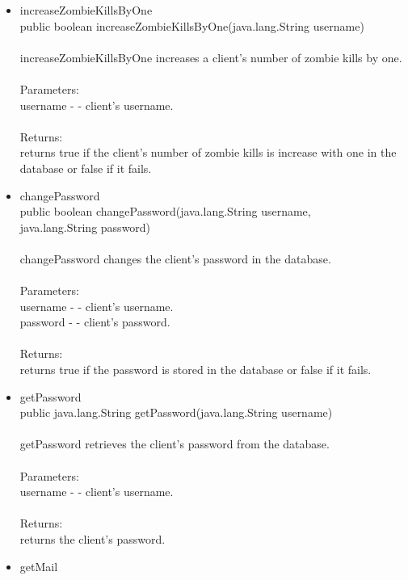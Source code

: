\documentclass[letterpaper]{article}
\begin{document}
\begin{itemize}
\begin{itemize}
											\item	increaseZombieKillsByOne \\
													public boolean increaseZombieKillsByOne(java.lang.String username) \\ \\
													increaseZombieKillsByOne increases a client's number of zombie kills by one. \\ \\
													Parameters: \\
													username - - client's username. \\ \\
													Returns: \\
													returns true if the client's number of zombie kills is increase with one in the database or false if it fails.
											\item	changePassword \\
													public boolean changePassword(java.lang.String username, \\
				                     java.lang.String password) \\ \\
													changePassword changes the client's password in the database. \\ \\
													Parameters: \\
													username - - client's username. \\
													password - - client's password. \\ \\
													Returns: \\
													returns true if the password is stored in the database or false if it fails.
											\item	getPassword \\
													public java.lang.String getPassword(java.lang.String username) \\ \\
													getPassword retrieves the client's password from the database. \\ \\
													Parameters: \\
													username - - client's username. \\ \\
													Returns: \\
													returns the client's password.
											\item	getMail \\

\end{itemize}
\end{itemize}
\end{document}
